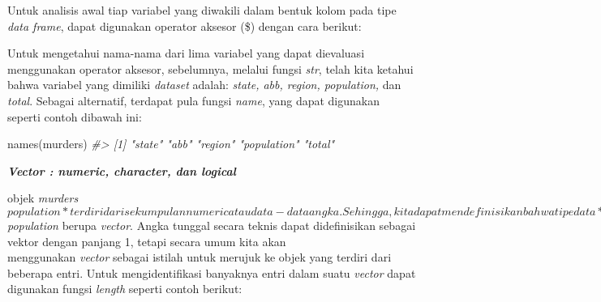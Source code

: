 \documentclass[
]{article}
\newenvironment{Shaded}{\begin{snugshade}}{\end{snugshade}}
\newcommand{\CommentTok}[1]{\textcolor[rgb]{0.56,0.35,0.01}{\textit{#1}}}
\newcommand{\FunctionTok}[1]{\textcolor[rgb]{0.00,0.00,0.00}{#1}}
\newcommand{\NormalTok}[1]{#1}
\newcommand{\SpecialCharTok}[1]{\textcolor[rgb]{0.00,0.00,0.00}{#1}}
\begin{document}
Untuk analisis awal tiap variabel yang diwakili dalam bentuk kolom pada
tipe \emph{data frame}, dapat digunakan operator aksesor (\$) dengan
cara berikut:

\begin{Shaded}
\end{Shaded}

Untuk mengetahui nama-nama dari lima variabel yang dapat dievaluasi
menggunakan operator aksesor, sebelumnya, melalui fungsi \emph{str},
telah kita ketahui bahwa variabel yang dimiliki \emph{dataset} adalah:
\emph{state, abb, region, population,} dan \emph{total}. Sebagai
alternatif, terdapat pula fungsi \emph{name}, yang dapat digunakan
seperti contoh dibawah ini:

\begin{Shaded}
\begin{Highlighting}[]
\FunctionTok{names}\NormalTok{(murders) }
\CommentTok{\#\textgreater{} [1] "state" "abb" "region" "population" "total" }
\end{Highlighting}
\end{Shaded}

\textbf{\emph{Vector : numeric, character, dan logical}}

objek
\emph{murders\(population* terdiri dari sekumpulan numeric atau data-data angka. Sehingga, kita dapat mendefinisikan bahwa tipe data *murders\)population}
berupa \emph{vector}. Angka tunggal secara teknis dapat didefinisikan
sebagai vektor dengan panjang 1, tetapi secara umum kita akan\\
menggunakan \emph{vector} sebagai istilah untuk merujuk ke objek yang
terdiri dari beberapa entri. Untuk mengidentifikasi banyaknya entri
dalam suatu \emph{vector} dapat digunakan fungsi \emph{length} seperti
contoh berikut:
\end{document}
